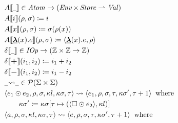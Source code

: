 \begin{figure}

\small\begin{align*}
&\hspace{0em} A \llbracket  \underline{\hspace{0.5em}}  \rrbracket   \in   \itop{Atom}   \rightarrow   (\itop{Env}   \times   \itop{Store}   \rightharpoonup   \itop{Val})  \\
&\hspace{0em} A \llbracket i \rrbracket ( \rho , \sigma )  \coloneqq  i \\
&\hspace{0em} A \llbracket x \rrbracket ( \rho , \sigma )  \coloneqq   \sigma ( \rho (x)) \\
&\hspace{0em} A \llbracket  \keyword{\lambda} (x).e \rrbracket ( \rho , \sigma )  \coloneqq   \langle  \keyword{\lambda} (x).e, \rho  \rangle   \\
&\hspace{0em}  \delta  \llbracket  \underline{\hspace{0.5em}}  \rrbracket   \in   \itop{IOp}   \rightarrow  ( \mathbb{Z}   \times   \mathbb{Z}   \rightarrow   \mathbb{Z} ) \\
&\hspace{0em}  \delta  \llbracket  \keywordop{+}  \rrbracket (i _1 ,i _2 )  \coloneqq  i _1  + i _2  \\
&\hspace{0em}  \delta  \llbracket  \keywordop{-}  \rrbracket (i _1 ,i _2 )  \coloneqq  i _1  - i _2  \\
&\hspace{0em}  \underline{\hspace{0.5em}}{  \rightsquigarrow  }\underline{\hspace{0.5em}}   \in   \mathcal{P} ( \Sigma   \times   \Sigma ) \\
&\hspace{0em}  \langle e _1   \odot  e _2 , \rho , \sigma , \kappa l, \kappa  \sigma , \tau  \rangle   \rightsquigarrow   \langle e _1 , \rho , \sigma , \tau , \kappa  \sigma ', \tau +1 \rangle   \;\;\text{where}\;\;   \\
&\hspace{2em}  \kappa  \sigma '  \coloneqq   \kappa  \sigma  \lbrack  \tau   \mapsto  ( \langle  \square   \odot  e _2  \rangle , \kappa l) \rbrack  \\
&\hspace{0em}  \langle a, \rho , \sigma , \kappa l, \kappa  \sigma , \tau  \rangle   \rightsquigarrow   \langle e, \rho , \sigma , \tau , \kappa  \sigma ', \tau +1 \rangle   \;\;\text{where}\;\;  \\

\end{align*}
\end{figure}
